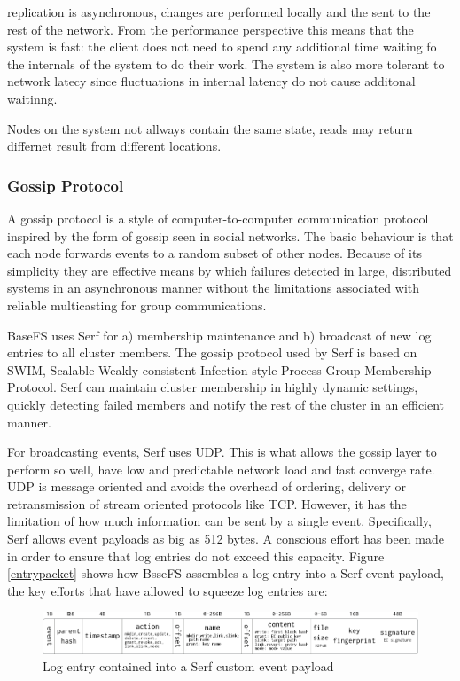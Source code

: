 \documentclass{sig-alternate}
\begin{document}
replication is asynchronous, changes are performed locally and the sent to the rest of the network. From the performance perspective this means that the system is fast: the client does not need to spend any additional time waiting fo the internals of the system to do their work. The system is also more tolerant to network latecy since fluctuations in internal latency do not cause additonal waitinng.

Nodes on the system not allways contain the same state, reads may return differnet result from different locations.


\subsubsection{Gossip Protocol}

A gossip protocol is a style of computer-to-computer communication protocol inspired by the form of gossip seen in social networks. The basic behaviour is that each node forwards events to a random subset of other nodes. Because of its simplicity they are effective means by which failures detected in large, distributed systems in an asynchronous manner without the limitations associated with reliable multicasting for group communications. 

BaseFS uses Serf for a) membership maintenance and b) broadcast of new log entries to all cluster members. The gossip protocol used by Serf is based on SWIM, Scalable Weakly-consistent Infection-style Process Group Membership Protocol\cite{SWIM}. Serf can maintain cluster membership in highly dynamic settings, quickly detecting failed members and notify the rest of the cluster in an efficient manner.

For broadcasting events, Serf uses UDP. This is what allows the gossip layer to perform so well, have low and predictable network load and fast converge rate. UDP is message oriented and avoids the overhead of ordering, delivery or retransmission of stream oriented protocols like TCP. However, it has the limitation of how much information can be sent by a single event. Specifically, Serf allows event payloads as big as 512 bytes. A conscious effort has been made in order to ensure that log entries do not exceed this capacity. Figure \ref{entrypacket} shows how BsseFS assembles a log entry into a Serf event payload, the key efforts that have allowed to squeeze log entries are: 


\begin{figure}
\centering
\includegraphics[width=\textwidth]{imgs/payload.png}
\caption{Log entry contained into a Serf custom event payload}
\label{fig:etc-time}
\end{figure}
\end{document}
